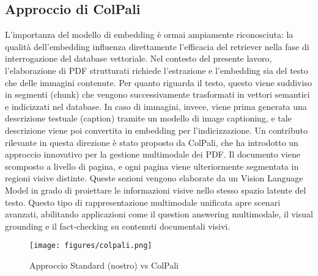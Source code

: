 \subsection{Approccio di ColPali}
L’importanza del modello di embedding è ormai ampiamente riconosciuta: la qualità dell'embedding influenza direttamente l’efficacia del retriever nella fase di interrogazione del database vettoriale. Nel contesto del presente lavoro, l’elaborazione di PDF strutturati richiede l’estrazione e l’embedding sia del testo che delle immagini contenute.
Per quanto riguarda il testo, questo viene suddiviso in segmenti (chunk) che vengono successivamente trasformati in vettori semantici e indicizzati nel database. In caso di immagini, invece, viene prima generata una descrizione testuale (caption) tramite un modello di image captioning, e tale descrizione viene poi convertita in embedding per l’indicizzazione.
Un contributo rilevante in questa direzione è stato proposto da ColPali, che ha introdotto un approccio innovativo per la gestione multimodale dei PDF. Il documento viene scomposto a livello di pagina, e ogni pagina viene ulteriormente segmentata in regioni visive distinte. Queste sezioni vengono elaborate da un Vision Language Model in grado di proiettare le informazioni visive nello stesso spazio latente del testo.
Questo tipo di rappresentazione multimodale unificata apre scenari avanzati, abilitando applicazioni come il question answering multimodale, il visual grounding e il fact-checking su contenuti documentali visivi.

\begin{figure}[!ht]
\centering
\texttt{[image: figures/colpali.png]}
\caption{Approccio Standard (nostro) vs ColPali}
\end{figure}


